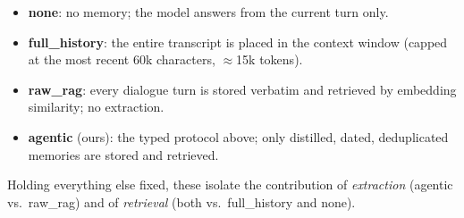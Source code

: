 \begin{itemize}
  \item \textbf{none}: no memory; the model answers from the current turn only.
  \item \textbf{full\_history}: the entire transcript is placed in the context window
  (capped at the most recent 60k characters, $\approx$15k tokens).
  \item \textbf{raw\_rag}: every dialogue turn is stored verbatim and retrieved by
  embedding similarity; no extraction.
  \item \textbf{agentic} (ours): the typed protocol above; only distilled, dated,
  deduplicated memories are stored and retrieved.
\end{itemize}

Holding everything else fixed, these isolate the contribution of \emph{extraction}
(agentic vs.\ raw\_rag) and of \emph{retrieval} (both vs.\ full\_history and none).
